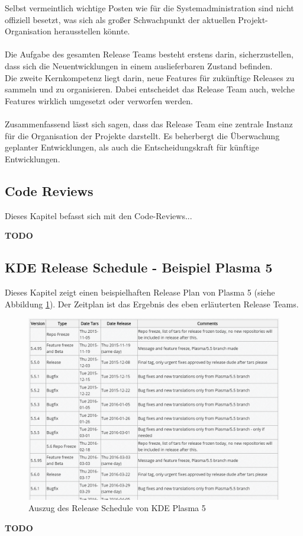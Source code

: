 \documentclass[10pt,a4paper,twocolumn]{article}
\begin{document}
Selbst vermeintlich wichtige Posten wie für die Systemadministration sind nicht offiziell besetzt, was sich als großer Schwachpunkt der aktuellen Projekt-Organisation herausstellen könnte.\\ \\
Die Aufgabe des gesamten Release Teams besteht erstens darin, sicherzustellen, dass sich die Neuentwicklungen in einem auslieferbaren Zustand befinden.\\
Die zweite Kernkompetenz liegt darin, neue Features für zukünftige Releases zu sammeln und zu organisieren. Dabei entscheidet das Release Team auch, welche Features wirklich umgesetzt oder verworfen werden. \cite{KDEReleaseTeam} \\ \\
Zusammenfassend lässt sich sagen, dass das Release Team eine zentrale Instanz für die Organisation der Projekte darstellt. Es beherbergt die Überwachung geplanter Entwicklungen, als auch die Entscheidungskraft für künftige Entwicklungen.

\subsection{Code Reviews \cite{KDECodeReview}}
Dieses Kapitel befasst sich mit den Code-Reviews...
\begin{center}
	\textbf{{\LARGE TODO}}
\end{center}

\subsection{KDE Release Schedule - Beispiel Plasma 5 \cite{KDEReleaseSchedulePlasma5}}
Dieses Kapitel zeigt einen beispielhaften Release Plan von Plasma 5 (siehe Abbildung \ref{fig:kde_schedulePlasma5}). Der Zeitplan ist das Ergebnis des eben erläuterten Release Teams.
\begin{figure}[h]
	\centering
	\includegraphics[width=\columnwidth]{images/KDE_schedule_plasma5.png}
	\caption{Auszug des Release Schedule von KDE Plasma 5 \cite{KDEReleaseSchedulePlasma5}}
	\label{fig:kde_schedulePlasma5}
\end{figure}
\begin{center}
	\textbf{{\LARGE TODO}}
\end{center}

{}

\listoffigures
\end{document}
